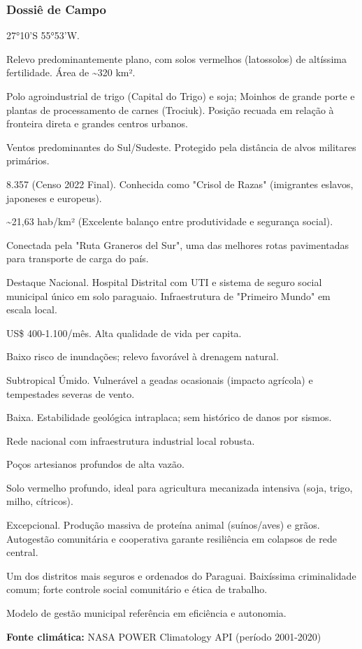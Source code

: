 \subsubsection{Dossiê de Campo}
\begin{description}[style=nextline,leftmargin=0.5cm,font=\bfseries]
\item[Coordenadas]  27°10'S 55°53'W.
\item[Topografia]  Relevo predominantemente plano, com solos vermelhos (latossolos) de altíssima fertilidade. Área de \textasciitilde 320 km².
\item[Alvos Estratégicos]  Polo agroindustrial de trigo (Capital do Trigo) e soja; Moinhos de grande porte e plantas de processamento de carnes (Trociuk). Posição recuada em relação à fronteira direta e grandes centros urbanos.
\item[Fallout]  Ventos predominantes do Sul/\allowbreak Sudeste. Protegido pela distância de alvos militares primários.
\item[População]  8.357 (Censo 2022 Final). Conhecida como "Crisol de Razas" (imigrantes eslavos, japoneses e europeus).
\item[Densidade]  \textasciitilde 21,63 hab/\allowbreak km² (Excelente balanço entre produtividade e segurança social).
\item[Vias de Acesso]  Conectada pela "Ruta Graneros del Sur", uma das melhores rotas pavimentadas para transporte de carga do país.
\item[Serviços]  Destaque Nacional. Hospital Distrital com UTI e sistema de seguro social municipal único em solo paraguaio. Infraestrutura de "Primeiro Mundo" em escala local.
\item[Custo de Vida]  US\$ 400-1.100/\allowbreak mês. Alta qualidade de vida per capita.
\item[Hidrologia]  Baixo risco de inundações; relevo favorável à drenagem natural.
\item[Clima]  Subtropical Úmido. Vulnerável a geadas ocasionais (impacto agrícola) e tempestades severas de vento.
\item[Sismicidade]  Baixa. Estabilidade geológica intraplaca; sem histórico de danos por sismos.
\item[Energia]  Rede nacional com infraestrutura industrial local robusta.
\item[Água]  Poços artesianos profundos de alta vazão.
\item[Solo]  Solo vermelho profundo, ideal para agricultura mecanizada intensiva (soja, trigo, milho, cítricos).
\item[Autossuficiência]  Excepcional. Produção massiva de proteína animal (suínos/\allowbreak aves) e grãos. Autogestão comunitária e cooperativa garante resiliência em colapsos de rede central.
\item[Segurança]  Um dos distritos mais seguros e ordenados do Paraguai. Baixíssima criminalidade comum; forte controle social comunitário e ética de trabalho.
\item[Leis Local]  Modelo de gestão municipal referência em eficiência e autonomia.
\end{description}
\textbf{Fonte climática:} NASA POWER Climatology API (período 2001-2020)


